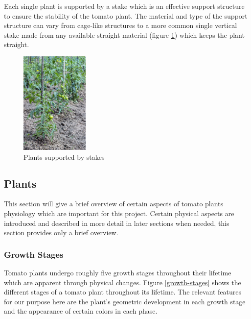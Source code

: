 Each single plant is supported by a stake which is an effective support structure to ensure
the stability of the tomato plant.
The material and type of the support structure can vary from cage-like structures
to a more common single vertical stake made from any available straight material (figure \ref{fig:stake})
which keeps the plant straight.

\begin{figure}[H]
    \centering
    \includegraphics[width=0.3\textwidth]{user-view/tomato_stake.jpg}
    \caption{Plants supported by stakes}
    \label{fig:stake}
\end{figure}

\subsection{Plants}\label{subsec:plants}

This section will give a brief overview of certain aspects of tomato plants physiology
which are important for this project.
Certain physical aspects are introduced and described in more detail in later sections when needed, this
section provides only a brief overview.

\subsubsection*{Growth Stages}\label{sec:growth-stages}

Tomato plants undergo roughly five growth stages throughout their lifetime which are apparent through
physical changes.
Figure \ref{growth-stages} shows the different stages of a tomato plant throughout its lifetime.
The relevant features for our purpose here are the plant's geometric development in each growth stage
and the appearance of certain colors in each phase.

